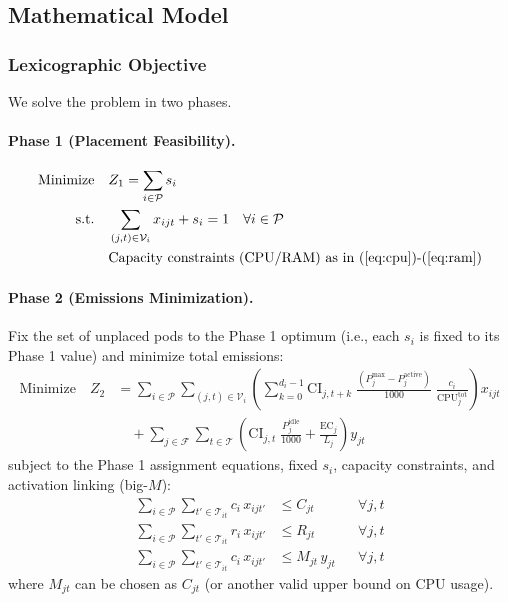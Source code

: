 \documentclass{article}
\begin{document}
\subsection{Mathematical Model}

\subsubsection{Lexicographic Objective}
We solve the problem in two phases.

\paragraph{Phase 1 (Placement Feasibility).}
\begin{align}
\text{Minimize}\quad & Z_1 = \sum_{i \in \mathcal{P}} s_i \\
\text{s.t.}\quad & \sum_{(j,t) \in \mathcal{V}_i} x_{ijt} + s_i = 1 \quad \forall i \in \mathcal{P} \\
& \text{Capacity constraints (CPU/RAM) as in (\ref{eq:cpu})-(\ref{eq:ram})}
\end{align}

\paragraph{Phase 2 (Emissions Minimization).}
Fix the set of unplaced pods to the Phase 1 optimum (i.e., each $s_i$ is fixed to its Phase 1 value) and minimize total emissions:
\begin{align}
\text{Minimize}\quad Z_2 &= \sum_{i \in \mathcal{P}} \sum_{(j,t) \in \mathcal{V}_i} \left( \sum_{k=0}^{d_i-1} \text{CI}_{j,t+k}\; \frac{(P^{\max}_j - P^{\text{active}}_j)}{1000}\; \frac{c_i}{\text{CPU}^{\text{tot}}_j} \right) x_{ijt} \\
&\quad + \sum_{j \in \mathcal{F}} \sum_{t \in \mathcal{T}} \left( \text{CI}_{j,t}\; \frac{P^{\text{idle}}_j}{1000} + \frac{\text{EC}_j}{L_j} \right) y_{jt}
\end{align}
subject to the Phase 1 assignment equations, fixed $s_i$, capacity constraints, and activation linking (big-$M$):
\begin{align}
\sum_{i \in \mathcal{P}} \sum_{t' \in \mathcal{T}_{it}} c_i\, x_{ijt'} &\le C_{jt} &&\forall j, t \label{eq:cpu} \\
\sum_{i \in \mathcal{P}} \sum_{t' \in \mathcal{T}_{it}} r_i\, x_{ijt'} &\le R_{jt} &&\forall j, t \label{eq:ram} \\
\sum_{i \in \mathcal{P}} \sum_{t' \in \mathcal{T}_{it}} c_i\, x_{ijt'} &\le M_{jt}\, y_{jt} &&\forall j, t
\end{align}
where $M_{jt}$ can be chosen as $C_{jt}$ (or another valid upper bound on CPU usage).
\end{document}
